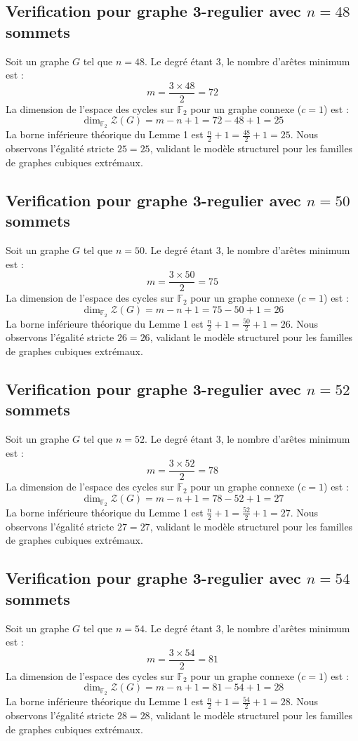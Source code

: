 \documentclass[11pt,a4paper]{article}
\begin{document}
\subsection{Verification pour graphe 3-regulier avec $n=48$ sommets}
Soit un graphe $G$ tel que $n = 48$. Le degré étant 3, le nombre d'arêtes minimum est :
$$ m = \frac{3 \times 48}{2} = 72 $$
La dimension de l'espace des cycles sur $\mathbb{F}_2$ pour un graphe connexe ($c=1$) est :
$$ \dim_{\mathbb{F}_2} \mathcal{Z}(G) = m - n + 1 = 72 - 48 + 1 = 25 $$
La borne inférieure théorique du Lemme 1 est $\frac{n}{2} + 1 = \frac{48}{2} + 1 = 25$.
Nous observons l'égalité stricte $25 = 25$, validant le modèle structurel pour les familles de graphes cubiques extrémaux.

\subsection{Verification pour graphe 3-regulier avec $n=50$ sommets}
Soit un graphe $G$ tel que $n = 50$. Le degré étant 3, le nombre d'arêtes minimum est :
$$ m = \frac{3 \times 50}{2} = 75 $$
La dimension de l'espace des cycles sur $\mathbb{F}_2$ pour un graphe connexe ($c=1$) est :
$$ \dim_{\mathbb{F}_2} \mathcal{Z}(G) = m - n + 1 = 75 - 50 + 1 = 26 $$
La borne inférieure théorique du Lemme 1 est $\frac{n}{2} + 1 = \frac{50}{2} + 1 = 26$.
Nous observons l'égalité stricte $26 = 26$, validant le modèle structurel pour les familles de graphes cubiques extrémaux.

\subsection{Verification pour graphe 3-regulier avec $n=52$ sommets}
Soit un graphe $G$ tel que $n = 52$. Le degré étant 3, le nombre d'arêtes minimum est :
$$ m = \frac{3 \times 52}{2} = 78 $$
La dimension de l'espace des cycles sur $\mathbb{F}_2$ pour un graphe connexe ($c=1$) est :
$$ \dim_{\mathbb{F}_2} \mathcal{Z}(G) = m - n + 1 = 78 - 52 + 1 = 27 $$
La borne inférieure théorique du Lemme 1 est $\frac{n}{2} + 1 = \frac{52}{2} + 1 = 27$.
Nous observons l'égalité stricte $27 = 27$, validant le modèle structurel pour les familles de graphes cubiques extrémaux.

\subsection{Verification pour graphe 3-regulier avec $n=54$ sommets}
Soit un graphe $G$ tel que $n = 54$. Le degré étant 3, le nombre d'arêtes minimum est :
$$ m = \frac{3 \times 54}{2} = 81 $$
La dimension de l'espace des cycles sur $\mathbb{F}_2$ pour un graphe connexe ($c=1$) est :
$$ \dim_{\mathbb{F}_2} \mathcal{Z}(G) = m - n + 1 = 81 - 54 + 1 = 28 $$
La borne inférieure théorique du Lemme 1 est $\frac{n}{2} + 1 = \frac{54}{2} + 1 = 28$.
Nous observons l'égalité stricte $28 = 28$, validant le modèle structurel pour les familles de graphes cubiques extrémaux.
\end{document}

